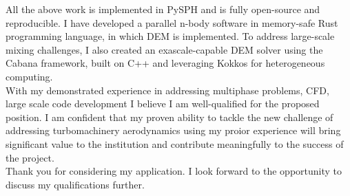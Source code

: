 \documentclass[11pt,a4paper,roman]{moderncv}
\begin{document}
\vspace{1em}
All the above work is implemented in PySPH and is fully open-source
and reproducible. I have developed a parallel n-body software in
memory-safe Rust programming language, in which DEM is implemented.
To address large-scale mixing challenges, I also created an
exascale-capable DEM solver using the Cabana framework, built on C++
and leveraging Kokkos for heterogeneous computing. \\



\vspace{1em}
With my demonstrated experience in addressing multiphase problems,
CFD, large scale code development I believe I am well-qualified for
the proposed position. I am confident that my proven ability to tackle
the new challenge of addressing turbomachinery aerodynamics using my
proior experience will bring significant value to the institution and
contribute meaningfully to the success of the project.\\



\vspace{1em}
Thank you for considering my application. I look forward to the
opportunity to discuss my qualifications further.\\



\vspace{0.5cm}


\makeletterclosing
\end{document}
